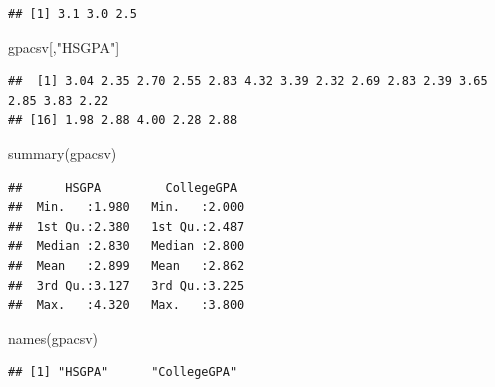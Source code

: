 \documentclass[
]{book}
\newenvironment{Shaded}{\begin{snugshade}}{\end{snugshade}}
\newcommand{\AttributeTok}[1]{\textcolor[rgb]{0.77,0.63,0.00}{#1}}
\newcommand{\DecValTok}[1]{\textcolor[rgb]{0.00,0.00,0.81}{#1}}
\newcommand{\FloatTok}[1]{\textcolor[rgb]{0.00,0.00,0.81}{#1}}
\newcommand{\FunctionTok}[1]{\textcolor[rgb]{0.00,0.00,0.00}{#1}}
\newcommand{\NormalTok}[1]{#1}
\newcommand{\OtherTok}[1]{\textcolor[rgb]{0.56,0.35,0.01}{#1}}
\newcommand{\SpecialCharTok}[1]{\textcolor[rgb]{0.00,0.00,0.00}{#1}}
\newcommand{\StringTok}[1]{\textcolor[rgb]{0.31,0.60,0.02}{#1}}
\theoremstyle{definition}
\theoremstyle{definition}
\theoremstyle{definition}
\theoremstyle{definition}
\theoremstyle{remark}
\begin{document}
\begin{verbatim}
## [1] 3.1 3.0 2.5
\end{verbatim}

\begin{Shaded}
\begin{Highlighting}[]
\NormalTok{gpacsv[,}\StringTok{"HSGPA"}\NormalTok{]}
\end{Highlighting}
\end{Shaded}

\begin{verbatim}
##  [1] 3.04 2.35 2.70 2.55 2.83 4.32 3.39 2.32 2.69 2.83 2.39 3.65 2.85 3.83 2.22
## [16] 1.98 2.88 4.00 2.28 2.88
\end{verbatim}

\begin{Shaded}
\begin{Highlighting}[]
\FunctionTok{summary}\NormalTok{(gpacsv)}
\end{Highlighting}
\end{Shaded}

\begin{verbatim}
##      HSGPA         CollegeGPA   
##  Min.   :1.980   Min.   :2.000  
##  1st Qu.:2.380   1st Qu.:2.487  
##  Median :2.830   Median :2.800  
##  Mean   :2.899   Mean   :2.862  
##  3rd Qu.:3.127   3rd Qu.:3.225  
##  Max.   :4.320   Max.   :3.800
\end{verbatim}

\begin{Shaded}
\begin{Highlighting}[]
\FunctionTok{names}\NormalTok{(gpacsv)}
\end{Highlighting}
\end{Shaded}

\begin{verbatim}
## [1] "HSGPA"      "CollegeGPA"
\end{verbatim}

\begin{Shaded}
\end{Shaded}
\end{document}
